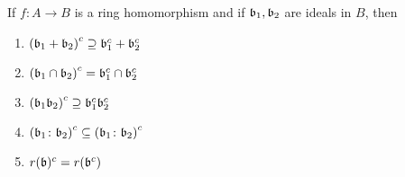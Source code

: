 \begin{proposition}{}{}
	If \(f\colon A \to B\) is a ring homomorphism and
	if \(\mathfrak{b}_1, \mathfrak{b}_2\) are ideals in \(B\),
	then
	\begin{enumerate}
		\item \(\left( \mathfrak{b}_1 + \mathfrak{b}_2 \right)^c \supseteq \mathfrak{b}_1^c + \mathfrak{b}_2^c\)
		\item \(\left( \mathfrak{b}_1 \cap \mathfrak{b}_2 \right)^c = \mathfrak{b}_1^c \cap \mathfrak{b}_2^c\)
		\item \(\left( \mathfrak{b}_1 \mathfrak{b}_2 \right)^c \supseteq \mathfrak{b}_1^c \mathfrak{b}_2^c\)
		\item \(\left( \mathfrak{b}_1 \colon \mathfrak{b}_2 \right)^c
			\subseteq \left( \mathfrak{b}_1 \colon \mathfrak{b}_2 \right)^c\)
		\item \(r(\mathfrak{b})^c = r(\mathfrak{b}^c)\)
	\end{enumerate}
\end{proposition}